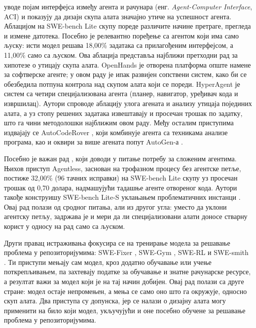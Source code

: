 \documentclass[12pt,a4paper]{report}
\begin{document}
	\textcite{yang2024sweagent} уводе појам интерфејса између агента и рачунара
	(енг. \textit{Agent-Computer Interface}, ACI) и показују да дизајн скупа
	алата значајно утиче на успешност агента. Аблацијом на SWE-bench Lite скупу
	пореде различите начине претраге, прегледа и измене датотека. Посебно је
	релевантно поређење са агентом који има само љуску: исти модел решава
	18,00\% задатака са прилагођеним интерфејсом, а 11,00\% само са љуском. Ова
	аблација представља најближи претходни рад за хипотезе о утицају скупа
	алата. OpenHands \parencite{wang2025openhands} је отворена платформа
	опште намене за софтверске агенте; у овом раду је ипак развијен сопствени
	систем, како би се обезбедила потпуна контрола над скупом алата који се
	пореди. HyperAgent \parencite{phan2024hyperagent} је систем са четири
	специјализована агента (планер, навигатор, уређивач кода и извршилац). Аутори
	спроводе аблацију улога агената и анализу утицаја појединих алата, а уз
	стопу решених задатака извештавају и просечан трошак по задатку, што га
	чини методолошки најближим овом раду. Међу осталим приступима
	издвајају се AutoCodeRover \parencite{zhang2024autocoderover}, који
	комбинује агента са техникама анализе програма, као и оквири за више
	агената попут AutoGen-а \parencite{wu2023autogen}.

	Посебно је важан рад \textcite{xia2025agentless}, који доводи у питање
	потребу за сложеним агентима. Њихов приступ Agentless, заснован на
	трофазном процесу без агентске петље, постиже 32,00\% (96 тачних исправки)
	на SWE-bench Lite скупу уз просечан трошак од 0,70 долара, надмашујући
	тадашње агенте отвореног кода. Аутори такође конструишу SWE-bench Lite-S
	уклањањем проблематичних инстанци \parencite{xia2025agentless}. Овај рад полази од сродног питања, али
	из другог угла: уместо да уклони агентску петљу, задржава је и мери да ли
	специјализовани алати доносе стварну корист у односу на рад само са љуском.

	Други правац истраживања фокусира се на тренирање модела за решавање
	проблема у репозиторијумима: SWE-Fixer \parencite{xie2025swefixer},
	SWE-Gym \parencite{pan2024swegym}, SWE-RL \parencite{wei2025swerl} и
	SWE-smith \parencite{yang2025swesmith}. Ти приступи мењају сам модел, кроз
	додатно обучавање или учење поткрепљивањем, па захтевају податке за обучавање
	и знатне рачунарске ресурсе, а резултат важи за модел који је на тај начин
	добијен. Овај рад полази са друге стране: модел остаје непромењен, а мења се
	само оно што га окружује, односно скуп алата. Два приступа су допунска, јер
	се налази о дизајну алата могу применити на било који модел, укључујући и
	оне посебно обучене за решавање проблема у репозиторијумима.
\end{document}
